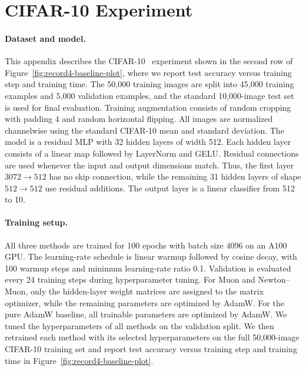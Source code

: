 \documentclass[11pt]{article}
\begin{document}
\section{CIFAR-10 Experiment}
\label{app:cifar10-details}

\paragraph{Dataset and model.}
This appendix describes the CIFAR-10~\citep{krizhevsky2009learning} experiment shown in the second row of Figure~\ref{fig:record4-baseline-plot}, where we report test accuracy versus training step and training time. The 50{,}000 training images are split into 45{,}000 training examples and 5{,}000 validation examples, and the standard 10{,}000-image test set is used for final evaluation. Training augmentation consists of random cropping with padding 4 and random horizontal flipping. All images are normalized channelwise using the standard CIFAR-10 mean and standard deviation. The model is a residual MLP with 32 hidden layers of width 512. Each hidden layer consists of a linear map followed by LayerNorm and GELU. Residual connections are used whenever the input and output dimensions match. Thus, the first layer $3072 \to 512$ has no skip connection, while the remaining 31 hidden layers of shape $512 \to 512$ use residual additions. The output layer is a linear classifier from 512 to 10.

\paragraph{Training setup.}
All three methods are trained for 100 epochs with batch size 4096 on an A100 GPU. The learning-rate schedule is linear warmup followed by cosine decay, with 100 warmup steps and minimum learning-rate ratio 0.1. Validation is evaluated every 24 training steps during hyperparameter tuning. For Muon and Newton--Muon, only the hidden-layer weight matrices are assigned to the matrix optimizer, while the remaining parameters are optimized by AdamW. For the pure AdamW baseline, all trainable parameters are optimized by AdamW. We tuned the hyperparameters of all methods on the validation split. We then retrained each method with its selected hyperparameters on the full 50{,}000-image CIFAR-10 training set and report test accuracy versus training step and training time in Figure~\ref{fig:record4-baseline-plot}.
\end{document}
